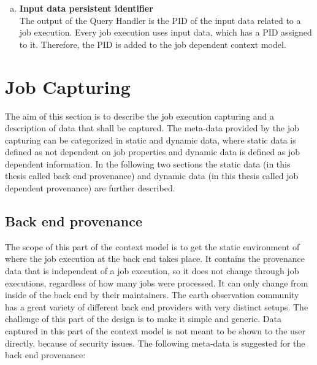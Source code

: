 \documentclass[draft,final]{vutinfth} %
\begin{document}
\begin{enumerate}[(a)]
\item \textbf{Input data persistent identifier} \\
	The output of the Query Handler is the PID of the input data related to a job execution. Every job execution uses input data, which has a PID assigned to it. Therefore, the PID is added to the job dependent context model. 
\end{enumerate}

\section{Job Capturing}\label{Design:Job Capturing}
The aim of this section is to describe the job execution capturing and a description of data that shall be captured. The meta-data provided by the job capturing can be categorized in static and dynamic data, where static data is defined as not dependent on job properties and dynamic data is defined as job dependent information. In the following two sections the static data (in this thesis called back end provenance) and dynamic data (in this thesis called job dependent provenance) are further described.     

\subsection{Back end provenance}\label{Design:Back end provenance}
The scope of this part of the context model is to get the static environment of where the job execution at the back end takes place. It contains the provenance data that is independent of a job execution, so it does not change through job executions, regardless of how many jobs were processed. It can only change from inside of the back end by their maintainers. The earth observation community has a great variety of different back end providers with very distinct setups. The challenge of this part of the design is to make it simple and generic. Data captured in this part of the context model is not meant to be shown to the user directly, because of security issues. The following meta-data is suggested for the back end provenance:
\end{document}
